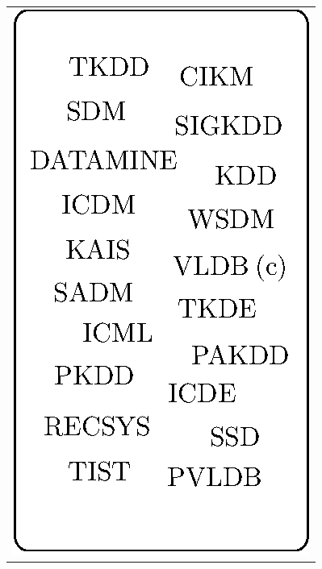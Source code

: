 \begin{table}[htbp]
\begin{tabular}{c}
\multirow{20}{*}{\includegraphics{fig/dm-norm-venues-blob.eps}} \\ %
\\
\\
\\
\\
\\
\\
\\
\\
\\
\\
\\
\\
\\
\\
\\
\\
\\
\\
\\
\bottomrule
\end{tabular} \ \

\end{table}

